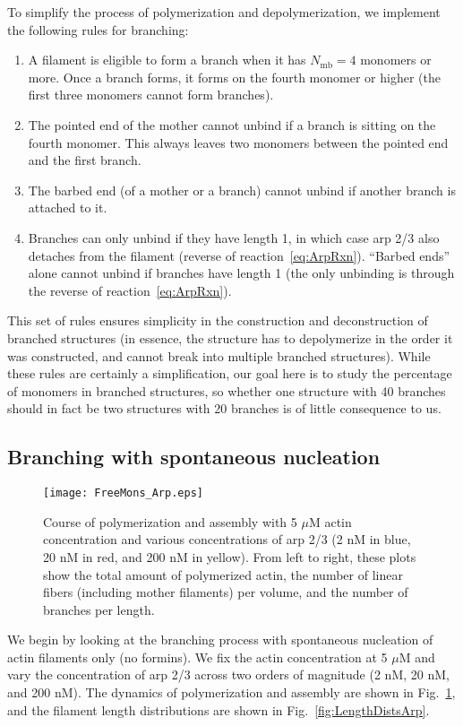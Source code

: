 \documentclass[11pt]{article}
\begin{document}
To simplify the process of polymerization and depolymerization, we implement the following rules for branching:
\begin{enumerate}
\item A filament is eligible to form a branch when it has $N_\text{mb}=4$ monomers or more. Once a branch forms, it forms on the fourth monomer or higher (the first three monomers cannot form branches). 
\item The pointed end of the mother cannot unbind if a branch is sitting on the fourth monomer. This always leaves two monomers between the pointed end and the first branch. 
\item The barbed end (of a mother or a branch) cannot unbind if another branch is attached to it. 
\item Branches can only unbind if they have length 1, in which case arp 2/3 also detaches from the filament (reverse of reaction\ \eqref{eq:ArpRxn}). ``Barbed ends'' alone cannot unbind if branches have length 1 (the only unbinding is through the reverse of reaction\ \eqref{eq:ArpRxn}).
\end{enumerate}
This set of rules ensures simplicity in the construction and deconstruction of branched structures (in essence, the structure has to depolymerize in the order it was constructed, and cannot break into multiple branched structures). While these rules are certainly a simplification, our goal here is to study the percentage of monomers in branched structures, so whether one structure with 40 branches should in fact be two structures with 20 branches is of little consequence to us. 



\subsection{Branching with spontaneous nucleation \label{sec:BrSN}}

\begin{figure}
\centering
\texttt{[image: FreeMons\_Arp.eps]}
\caption{\label{fig:PolyDynamicsArp}Course of polymerization and assembly with 5 $\mu$M actin concentration and various concentrations of arp 2/3 (2 nM in blue, 20 nM in red, and 200 nM in yellow). From left to right, these plots show the total amount of polymerized actin, the number of linear fibers (including mother filaments) per volume, and the number of branches per length. }
\end{figure}

We begin by looking at the branching process with spontaneous nucleation of actin filaments only (no formins). We fix the actin concentration at 5 $\mu$M and vary the concentration of arp 2/3 across two orders of magnitude (2 nM, 20 nM, and 200 nM). The dynamics of polymerization and assembly are shown in Fig.\ \ref{fig:PolyDynamicsArp}, and the filament length distributions are shown in Fig.\ \ref{fig:LengthDistsArp}. 
\end{document}
